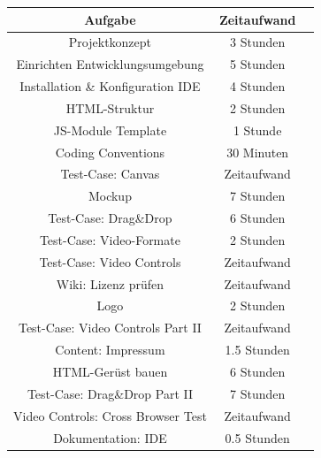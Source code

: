 \documentclass[a4paper,10pt]{scrartcl}
\begin{document}
\begin{tabular}{|c|c|c|}\hline
	\textbf{Aufgabe} & \textbf{Zeitaufwand} \\ \hline
	
	Projektkonzept & 3 Stunden \\ \hline
	
	Einrichten Entwicklungsumgebung & 5 Stunden \\ \hline
	
	Installation \& Konfiguration IDE & 4 Stunden \\ \hline
	
	HTML-Struktur & 2 Stunden \\ \hline
	
	JS-Module Template & 1 Stunde \\ \hline
	
	Coding Conventions & 30 Minuten \\ \hline
	
	Test-Case: Canvas & Zeitaufwand \\ \hline
	
	Mockup & 7 Stunden \\ \hline
	
	Test-Case: Drag\&Drop & 6 Stunden \\ \hline
	
	Test-Case: Video-Formate & 2 Stunden \\ \hline
	
	Test-Case: Video Controls & Zeitaufwand \\ \hline
		
	Wiki: Lizenz prüfen & Zeitaufwand \\ \hline
	
	Logo & 2 Stunden \\ \hline
	
	Test-Case: Video Controls Part II & Zeitaufwand \\ \hline
	
	Content: Impressum & 1.5 Stunden \\ \hline
	
	HTML-Gerüst bauen & 6 Stunden \\ \hline
	
	Test-Case: Drag\&Drop Part II & 7 Stunden \\ \hline
	
	Video Controls: Cross Browser Test & Zeitaufwand \\ \hline
	
	Dokumentation: IDE & 0.5 Stunden \\ \hline
	

\end{tabular}
\end{document}
